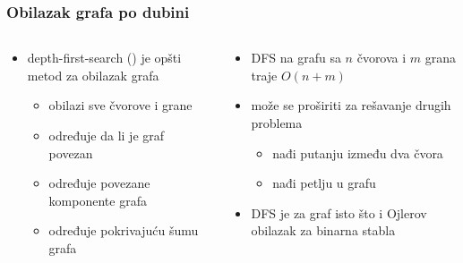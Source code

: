 \documentclass[compress,aspectratio=169]{beamer}
\begin{document}
\begin{frame}[fragile]
  \frametitle{Obilazak grafa po dubini}
  \begin{columns}
    \begin{column}[t]{8cm}
      \begin{itemize}
        \item depth-first-search () je opšti metod za 
        obilazak grafa
        \begin{itemize}
          \item obilazi sve čvorove i grane
          \item određuje da li je graf povezan
          \item određuje povezane komponente grafa
          \item određuje pokrivajuću šumu grafa
        \end{itemize}
      \end{itemize}
    \end{column}
    \begin{column}[t]{8cm}
      \begin{itemize}
        \item DFS na grafu sa $n$ čvorova i $m$ grana traje $O(n+m)$
        \item može se proširiti za rešavanje drugih problema
        \begin{itemize}
          \item nađi putanju između dva čvora
          \item nađi petlju u grafu
        \end{itemize}
        \item DFS je za graf isto što i Ojlerov obilazak za binarna 
          stabla
      \end{itemize}
    \end{column}
  \end{columns}
\end{frame}
\end{document}
